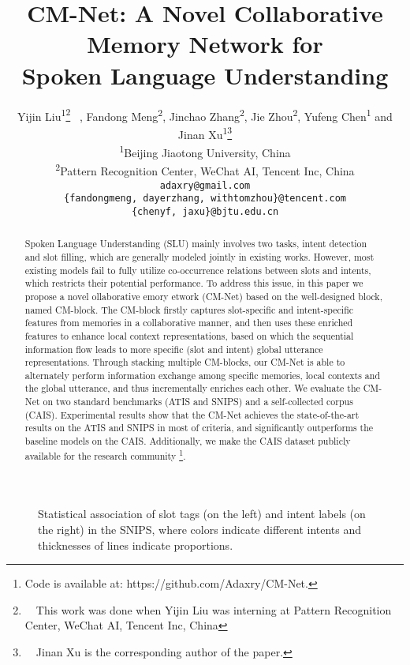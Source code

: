 \documentclass[11pt,a4paper]{article}
\title{CM-Net: A Novel Collaborative Memory Network for \\Spoken Language Understanding}
\author{
  Yijin Liu\textsuperscript{1}\thanks{\ \ This work was done when Yijin Liu was interning at Pattern Recognition Center, WeChat AI, Tencent Inc, China} \ ,
  Fandong Meng\textsuperscript{2}, 
  Jinchao Zhang\textsuperscript{2}, 
  Jie Zhou\textsuperscript{2},
  Yufeng Chen\textsuperscript{1} 
  and Jinan Xu\textsuperscript{1}\thanks{ \ \ Jinan Xu is the corresponding author of the paper.} \\
  \textsuperscript{1}Beijing Jiaotong University, China \\
  \textsuperscript{2}Pattern Recognition Center, WeChat AI, Tencent Inc, China \\
  \texttt{adaxry@gmail.com} \\
  \texttt{\{fandongmeng, dayerzhang, withtomzhou\}@tencent.com} \\
  \texttt{\{chenyf, jaxu\}@bjtu.edu.cn} \\
}
\date{}
\begin{document}
\maketitle

\begin{abstract}
  Spoken Language Understanding (SLU) mainly involves two tasks, intent detection and slot filling, which are generally modeled jointly in existing works. 
  However, most existing models fail to fully utilize co-occurrence relations between slots and intents, which restricts their potential performance. To address this issue, in this paper we propose a novel ollaborative emory etwork (CM-Net) based on the well-designed block, named CM-block. The CM-block firstly captures slot-specific and intent-specific features from memories in a collaborative manner, and then uses these enriched features to enhance local context representations, based on which the sequential information flow leads to more specific (slot and intent) global utterance representations.
Through stacking multiple CM-blocks, our CM-Net is able to alternately perform information exchange among specific memories, local contexts and the global utterance, and thus incrementally enriches
  each other.
  We evaluate the CM-Net on two standard benchmarks (ATIS and SNIPS) and a self-collected corpus (CAIS).
  Experimental results show that the CM-Net achieves the state-of-the-art results on the ATIS and SNIPS in most of criteria, and significantly outperforms the baseline models on the CAIS.
  Additionally, we make the CAIS dataset publicly available for the research community \footnote{Code is available at:  https://github.com/Adaxry/CM-Net.}. 
\end{abstract}

\begin{figure}[t!]
\begin{center}
      \vspace{-6pt}
      \caption{
Statistical association
      of slot tags (on the left) and intent labels (on the right) in the SNIPS, where colors indicate different intents and thicknesses of lines indicate proportions.
      } \vspace{-6pt}
      \label{slot_intent_distribution}  
 \end{center} 
\end{figure}
\end{document}
